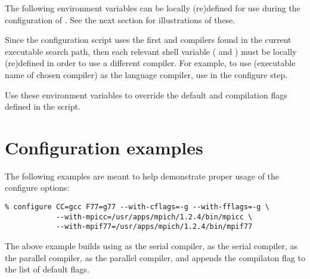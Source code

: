 
\noindent The following environment variables can be locally (re)defined for use 
during the configuration of {\sundials}. See the next section for illustrations of these.

\begin{config}

\item {}

\item {}

  Since the configuration script uses the first {\C} and {\F} compilers found in
  the current executable search path, then each relevant shell variable (
  and ) must be locally (re)defined in order to use a different compiler. 
  For example, to use  (executable name of chosen compiler) as the {\C}
  language compiler, use  in the configure step.

\item {}

\item {}

  Use these environment variables to override the default {\C} and {\F}
  compilation flags defined in the  script.

\end{config}



\section{Configuration examples}

The following examples are meant to help demonstrate proper usage of the configure options:

\begin{verbatim}
% configure CC=gcc F77=g77 --with-cflags=-g --with-fflags=-g \
            --with-mpicc=/usr/apps/mpich/1.2.4/bin/mpicc \ 
            --with-mpif77=/usr/apps/mpich/1.2.4/bin/mpif77
\end{verbatim}

\noindent The above example builds {\sundials} using  as the serial {\C}
compiler, \id{g77} as the serial {\F} compiler, \id{mpicc} as the parallel {\C}
compiler, \id{mpif77} as the parallel {\F} compiler, and appends the \id{-g}
compilaton flag to the list of default flags.

